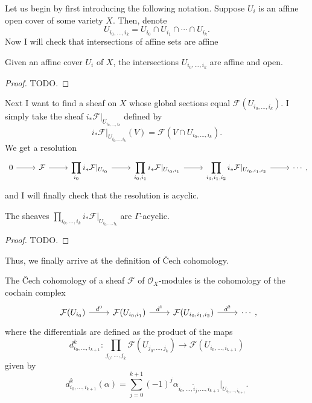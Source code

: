 Let us begin by first introducing the following notation. Suppose $U_{i}$
is an affine open cover of some variety $X$. Then, denote
\[
  U_{i_{0},\ldots, i_{k}}=U_{i_{0}}\cap U_{i_{1}}\cap\cdots\cap U_{i_{k}}.
\]
Now I will check that intersections of affine sets are affine
\begin{prop}
  Given an affine cover $U_{i}$ of $X$, the intersections
  $U_{i_{0},\ldots,i_{k}}$ are affine and open.
\end{prop}
\begin{proof}
  TODO.
\end{proof}
Next I want to find a sheaf on $X$ whose global sections equal
$\mathcal{F}(U_{i_{0},\ldots,i_{k}})$. I simply take the sheaf
$i_{\ast}\mathcal{F}\vert_{U_{i_{0},\ldots,i_{k}}}$ defined by
\[
  i_{\ast}\mathcal{F}\vert_{U_{i_{0},\ldots,i_{k}}}(V)=\mathcal{F}
  (V\cap U_{i_{0},\ldots,i_{k}}).
\]
We get a resolution
\[\begin{tikzcd}
    0\rar & \mathcal{F}\rar
    & \displaystyle\prod_{i_{0}}i_{\ast}\mathcal{F}\vert_{U_{i_{0}}}\rar
    & \displaystyle\prod_{i_{0},i_{1}}i_{\ast}\mathcal{F}\vert_{U_{i_{0},i_{1}}}\rar
    & \displaystyle\prod_{i_{0},i_{1},i_{2}}i_{\ast}\mathcal{F}\vert_{U_{i_{0},i_{1},i_{2}}}\rar
    & \cdots
  \end{tikzcd},\]
and I will finally check that the resolution is acyclic.
\begin{prop}
  The sheaves $\displaystyle\prod_{i_{0},\ldots,i_{k}}i_{\ast}\mathcal{F}
  \vert_{U_{i_{0},\ldots,i_{k}}}$ are $\Gamma$-acyclic.
\end{prop}
\begin{proof}
  TODO.
\end{proof}
Thus, we finally arrive at the definition of \v Cech cohomology.
\begin{defin}\label{def:cech}
  The \v Cech cohomology of a sheaf $\mathcal{F}$ of
  $\mathscr{O}_{X}$-modules is the cohomology of the cochain complex
  \[\begin{tikzcd}
      \mathcal{F}(U_{i_{0}})\rar{d^{0}} & \mathcal{F}(U_{i_{0},i_{1}})\rar{d^{1}}
      & \mathcal{F}(U_{i_{0},i_{1},i_{2}})\rar{d^{2}} & \cdots
    \end{tikzcd},\]
  where the differentials are defined as the product of the maps
  \[d_{i_{0},\ldots,i_{k+1}}^{k}:\displaystyle\prod_{j_{0},\ldots,j_{k}}
  \mathcal{F}(U_{j_{0},\ldots,j_{k}})\to \mathcal{F}(U_{i_{0},\ldots,i_{k+1}})\]
  given by
  \[
    d_{i_{0},\ldots,i_{k+1}}^{k}(\alpha)
    =\sum_{j=0}^{k+1}(-1)^{j}\alpha_{i_{0},\ldots,\hat{i}_{j},\ldots,i_{k+1}}
    \vert_{U_{i_{0},\ldots,i_{k+1}}}.
  \]
\end{defin}

